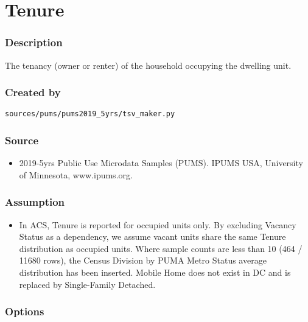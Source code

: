 \section{Tenure}\label{tenure}

\subsubsection{Description}\label{description-140}

The tenancy (owner or renter) of the household occupying the dwelling
unit.

\subsubsection{Created by}\label{created-by-141}

\texttt{sources/pums/pums2019\_5yrs/tsv\_maker.py}

\subsubsection{Source}\label{source-143}

\begin{itemize}
 
\item
  2019-5yrs Public Use Microdata Samples (PUMS). IPUMS USA, University
  of Minnesota, www.ipums.org.
\end{itemize}

\subsubsection{Assumption}\label{assumption-80}

\begin{itemize}
 
\item
  In ACS, Tenure is reported for occupied units only. By excluding
  Vacancy Status as a dependency, we assume vacant units share the same
  Tenure distribution as occupied units. Where sample counts are less
  than 10 (464 / 11680 rows), the Census Division by PUMA Metro Status
  average distribution has been inserted. \textquotesingle Mobile
  Home\textquotesingle{} does not exist in DC and is replaced by
  \textquotesingle Single-Family Detached\textquotesingle.
\end{itemize}

\subsubsection{Options}\label{options-144}

